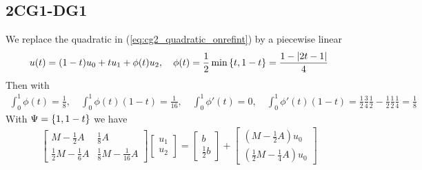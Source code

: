 \documentclass[english,12pt,a4paper]{article}
\begin{document}
\subsection{2CG1-DG1}\label{subsec:}
%
We replace the quadratic in (\ref{eq:cg2_quadratic_onrefint}) by a piecewise linear
%
\begin{equation}\label{eq:cg2_quadratic_onrefint}
u(t) = (1-t)u_0 + t u_1 + \phi(t) u_2,\quad \phi(t) = \frac12\min\left\{t, 1-t\right\} = \frac{1-|2t-1|}{4} 
\end{equation}
%
Then with
%
\begin{align*}
\int_0^1 \phi(t) = \frac18,\quad \int_0^1 \phi(t)(1-t) = \frac{1}{16},\quad \int_0^1 \phi'(t) = 0,\quad \int_0^1 \phi'(t)(1-t) =\frac12\frac34\frac12 - \frac12\frac12\frac14=\frac18
\end{align*}
%
With $\Psi=\left\{1, 1-t\right\}$ we have
%
\begin{align*}
\begin{bmatrix}
M - \frac12 A & \frac18 A\\
\frac12 M - \frac16 A &  \frac18 M - \frac{1}{16}A
\end{bmatrix}
\begin{bmatrix}
u_1 \\ u_2
\end{bmatrix}
=
\begin{bmatrix}
b \\\frac12 b
\end{bmatrix}
+
\begin{bmatrix}
(M - \frac12 A) u_0  \\ (\frac12 M - \frac14 A) u_0 
\end{bmatrix}
\end{align*}
%
%
\end{document}
